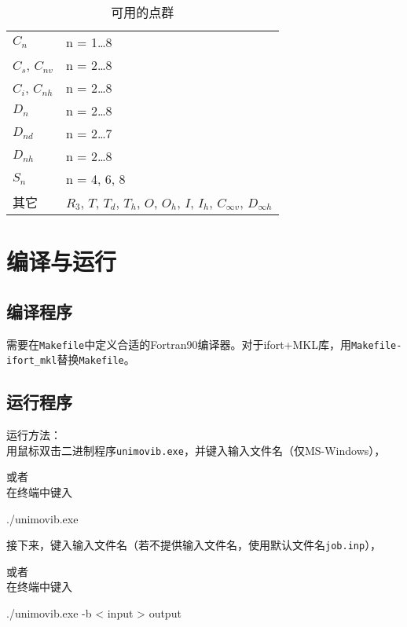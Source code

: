 \documentclass[12pt,a4paper,openany,twoside,cap,UTF8]{ctexbook}
\begin{document}
\begin{table}[!htbp]
\caption{可用的点群}\label{tab:symm}
\small\centering
\begin{tabular}{ll}
\hline\hline
$C_{n}$           & n = 1\ldots 8 \\
$C_s$, $C_{nv}$   & n = 2\ldots 8 \\
$C_i$, $C_{nh}$   & n = 2\ldots 8 \\
$D_{n}$           & n = 2\ldots 8 \\
$D_{nd}$          & n = 2\ldots 7 \\
$D_{nh}$          & n = 2\ldots 8 \\
$S_{n}$           & n = 4, 6, 8 \\
其它            & $R_3$, $T$, $T_d$, $T_h$, $O$, $O_h$, $I$, $I_h$, $C_{\infty v}$, $D_{\infty h}$ \\
\hline\hline
\end{tabular}
\end{table}


\chapter{编译与运行} \label{part:setting}

\section{编译程序} \label{sec:install}

需要在\verb|Makefile|中定义合适的Fortran90编译器。对于ifort+MKL库，用\verb|Makefile-ifort_mkl|替换\verb|Makefile|。


\section{运行程序} \label{sec:run}

运行方法：\\
用鼠标双击二进制程序\verb|unimovib.exe|，并键入输入文件名（仅MS-Windows），

或者 \\
在终端中键入
\begin{commandshell}
./unimovib.exe
\end{commandshell}
\noindent 接下来，键入输入文件名（若不提供输入文件名，使用默认文件名\verb|job.inp|），

或者 \\
在终端中键入
\begin{commandshell}
./unimovib.exe -b < input > output
\end{commandshell}
\end{document}
